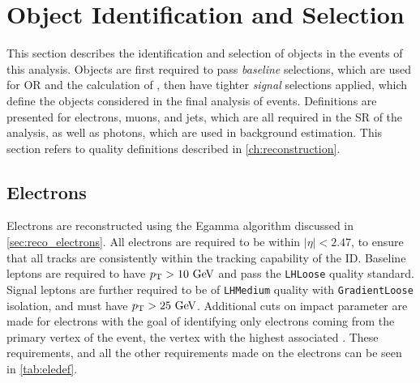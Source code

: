 
\chapter{Object Identification and Selection} %
\label{ch:objects} 

This section describes the identification and selection of objects in the events of this analysis. Objects are first required to pass \textit{baseline} selections, which are used for \acf{OR} and the calculation of \met, then have tighter \textit{signal} selections applied, which define the objects considered in the final analysis of events. Definitions are presented for electrons, muons, and jets, which are all required in the \ac{SR} of the analysis, as well as photons, which are used in background estimation. This section refers to quality definitions described in \autoref{ch:reconstruction}.


\section{Electrons}

Electrons are reconstructed using the Egamma algorithm discussed in \autoref{sec:reco_electrons}. All electrons are required to be within $|\eta|<2.47$, to ensure that all tracks are consistently within the tracking capability of the \ac{ID}. Baseline leptons are required to have $\pt>10\gev$ and pass the \texttt{LHLoose} quality standard. Signal leptons are further required to be of \texttt{LHMedium} quality with \texttt{GradientLoose} isolation, and must have $\pt>25\gev$. Additional cuts on impact parameter are made for electrons with the goal of identifying only electrons coming from the primary vertex of the event, the vertex with the highest associated \pt. These requirements, and all the other requirements made on the electrons can be seen in \autoref{tab:eledef}. 

